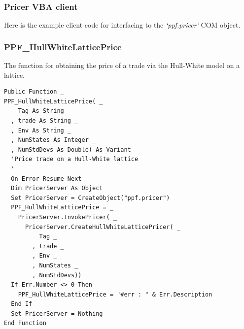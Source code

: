 \subsubsection{Pricer VBA client}

Here is the example client code for interfacing to the
\emph{`ppf.pricer'} COM object.

\subsubsection{PPF\_HullWhiteLatticePrice}

The function for obtaining the price of a trade via the Hull-White
model on a lattice.

\begin{verbatim}
Public Function _
PPF_HullWhiteLatticePrice( _
    Tag As String _
  , trade As String _
  , Env As String _
  , NumStates As Integer _
  , NumStdDevs As Double) As Variant
  'Price trade on a Hull-White lattice
  '
  On Error Resume Next
  Dim PricerServer As Object
  Set PricerServer = CreateObject("ppf.pricer")
  PPF_HullWhiteLatticePrice = _
    PricerServer.InvokePricer( _
      PricerServer.CreateHullWhiteLatticePricer( _
          Tag _
        , trade _
        , Env _
        , NumStates _
        , NumStdDevs))
  If Err.Number <> 0 Then
    PPF_HullWhiteLatticePrice = "#err : " & Err.Description
  End If
  Set PricerServer = Nothing
End Function
\end{verbatim}
